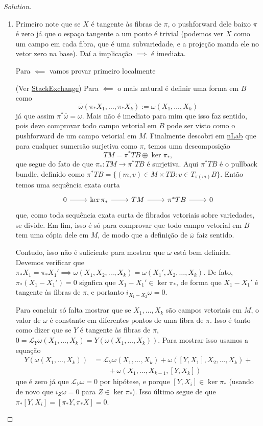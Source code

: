 \begin{proof}[Solution]\leavevmode
\begin{enumerate}[label=\alph*.]
	\item Primeiro note que se $X$ é tangente às fibras de $\pi$, o pushforward dele baixo $\pi$ é zero já que o espaço tangente a um ponto é trivial (podemos ver $X$ como um campo em cada fibra, que é uma subvariedade, e a projeção manda ele no vetor zero na base). Daí a implicação $\implies $ é imediata.

	Para $\impliedby$ vamos provar primeiro localmente

	(Ver \href{https://math.stackexchange.com/questions/69658/basic-differential-forms}{StackExchange}) Para $\impliedby$ o mais natural é definir uma forma em $B$ como
	\[\overline{\omega}(\pi_*X_1,\ldots,\pi_*X_k):=\omega(X_1,\ldots,X_k)\]
já que assim $\pi^*\overline{\omega}=\omega$. Mais não é imediato para mim que isso faz sentido, pois devo comprovar todo campo vetorial em $B$ pode ser visto como o pushforward de um campo vetorial em $M$. Finalmente descobri em \href{https://ncatlab.org/nlab/show/vertical+vector+field}{nLab} que para cualquer sumersão surjetiva como $\pi$, temos uma descomposição
\[TM=\pi^*TB\oplus \ker \pi_*,\]
que segue do fato de que $\pi_* :TM\longrightarrow \pi^*TB$ é surjetiva. Aqui $\pi^*TB$ é o pullback bundle, definido como $\pi^*TB=\{(m,v)\in M\times TB:v\in T_{\pi(m)}B\}$. Então temos uma sequência exata curta
\[\begin{tikzcd}
	0\arrow[r]&\ker \pi_*\arrow[r]& TM\arrow[r]&\pi^*TB\arrow[r]&0
\end{tikzcd}\]
que, como toda sequência exata curta de fibrados vetoriais sobre variedades, se divide. Em fim, isso é só para comprovar que todo campo vetorial em $B$ tem uma cópia dele em $M$, de modo que a definição de $\overline{\omega}$ faiz sentido.

Contudo, isso não é suficiente para mostrar que $\overline{\omega}$ está bem definida. Devemos verificar que  $\pi_*X_1=\pi_*X_1'\implies \omega(X_1,X_2,\ldots,X_k)=\omega(X_1',X_2,\ldots,X_k)$. De fato, $\pi_*(X_1-X_1')=0$ signfica que $X_1-X_1'\in\ker \pi_*$, de forma que $X_1-X_1'$ é tangente às fibras de $\pi$, e portanto $i_{X_1-X_2}\omega=0$.

Para concluir só falta mostrar que se $X_1,\ldots,X_k$ são campos vetoriais em $M$, o valor de $\omega$ é constante em diferentes pontos de uma fibra de $\pi$. Isso é tanto como dizer que se $Y$ é tangente às fibras de $\pi$, $0=\mathcal{L}_{Y}\omega(X_1,\ldots,X_k)=Y(\omega(X_1,\ldots,X_k))$. Para mostrar isso usamos a equação 
\begin{align*}
	Y(\omega(X_1,\ldots,X_k))&=\mathcal{L}_{Y}\omega(X_1,\ldots,X_k)+\omega([Y,X_1],X_2,\ldots,X_k)+\\
				 &\qquad  +\omega(X_1,\ldots,X_{k-1},[Y,X_k])
\end{align*}
que é zero já que $\mathcal{L}_{Y}\omega=0$ por hipótese, e porque $[Y,X_i]\in\ker \pi_* $ (usando de novo que $i_Z\omega=0$ para $ Z\in\ker \pi_* $). Isso último segue de que $\pi_* [Y,X_i]= [\pi_* Y,\pi_* X]=0$.


\end{enumerate}
\end{proof}
